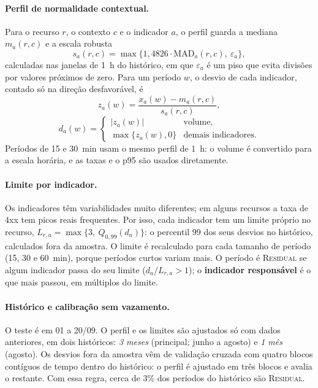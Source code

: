 \documentclass[sigconf,nonacm]{acmart}
\newcommand{\Residual}{\textsc{Residual}\xspace}
\begin{document}
\paragraph{Perfil de normalidade contextual.} Para o recurso $r$, o contexto $c$ e o indicador $a$, o perfil guarda a mediana $m_a(r,c)$ e a escala robusta~\citep{leys2013mad}
\begin{equation}
  s_a(r,c)=\max\{1{,}4826\cdot\mathrm{MAD}_a(r,c),\ \varepsilon_a\},
\end{equation}
calculadas nas janelas de 1~h do histórico, em que $\varepsilon_a$ é um piso que evita divisões por valores próximos de zero. Para um período $w$, o desvio de cada indicador, contado só na direção desfavorável, é
\begin{equation}
  z_a(w)=\frac{x_a(w)-m_a(r,c)}{s_a(r,c)},
\end{equation}
\begin{equation}
  d_a(w)=\begin{cases}|z_a(w)| & \text{volume,}\\ \max\{z_a(w),0\} & \text{demais indicadores.}\end{cases}
\end{equation}
Períodos de 15 e 30~min usam o mesmo perfil de 1~h: o volume é convertido para a escala horária, e as taxas e o p95 são usados diretamente.

\paragraph{Limite por indicador.} Os indicadores têm variabilidades muito diferentes; em alguns recursos a taxa de 4xx tem picos reais frequentes. Por isso, cada indicador tem um limite próprio no recurso, $L_{r,a}=\max\{3,\ Q_{0{,}99}(d_a)\}$: o percentil 99 dos seus desvios no histórico, calculados fora da amostra. O limite é recalculado para cada tamanho de período (15, 30 e 60~min), porque períodos curtos variam mais. O período é \Residual se algum indicador passa do seu limite ($d_a/L_{r,a}>1$); o \textbf{indicador responsável} é o que mais passou, em múltiplos do limite.

\paragraph{Histórico e calibração sem vazamento.} O teste é em 01 a 20/09. O perfil e os limites são ajustados só com dados anteriores, em dois históricos: \emph{3 meses} (principal; junho a agosto) e \emph{1 mês} (agosto). Os desvios fora da amostra vêm de validação cruzada com quatro blocos contíguos de tempo dentro do histórico: o perfil é ajustado em três blocos e avalia o restante. Com essa regra, cerca de 3\% dos períodos do histórico são \Residual.
\end{document}
